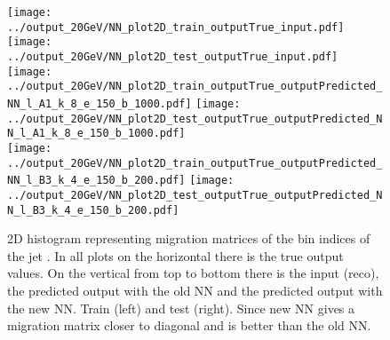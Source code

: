 \begin{figure}[h]
  \centering
  \texttt{[image: ../output\_20GeV/NN\_plot2D\_train\_outputTrue\_input.pdf]}
  \texttt{[image: ../output\_20GeV/NN\_plot2D\_test\_outputTrue\_input.pdf]}\\
  \texttt{[image: ../output\_20GeV/NN\_plot2D\_train\_outputTrue\_outputPredicted\_NN\_l\_A1\_k\_8\_e\_150\_b\_1000.pdf]}
  \texttt{[image: ../output\_20GeV/NN\_plot2D\_test\_outputTrue\_outputPredicted\_NN\_l\_A1\_k\_8\_e\_150\_b\_1000.pdf]}\\
  \texttt{[image: ../output\_20GeV/NN\_plot2D\_train\_outputTrue\_outputPredicted\_NN\_l\_B3\_k\_4\_e\_150\_b\_200.pdf]}
  \texttt{[image: ../output\_20GeV/NN\_plot2D\_test\_outputTrue\_outputPredicted\_NN\_l\_B3\_k\_4\_e\_150\_b\_200.pdf]}\\
  \caption{2D histogram representing migration matrices of the bin indices of the jet \pt. In all plots on the horizontal there is the true output values. On the vertical from top to bottom there is the input (reco), the predicted output with the old NN and the predicted output with the new NN. Train (left) and test (right). Since new NN gives a migration matrix closer to diagonal and is better than the old NN.}
  \label{fig:2DMigrationMatrix}
\end{figure}



